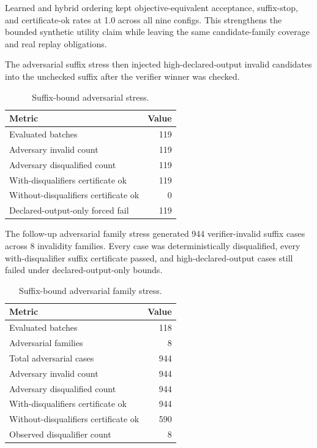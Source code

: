 \documentclass[11pt]{article}
\begin{document}
Learned and hybrid ordering kept objective-equivalent acceptance, suffix-stop,
and certificate-ok rates at 1.0 across all nine configs. This strengthens the
bounded synthetic utility claim while leaving the same candidate-family
coverage and real replay obligations.

The adversarial suffix stress then injected high-declared-output invalid
candidates into the unchecked suffix after the verifier winner was checked.

\begin{table}[h]
\centering
\caption{Suffix-bound adversarial stress.}
\begin{tabular}{lr}
\toprule
Metric & Value \\
\midrule
Evaluated batches & 119 \\
Adversary invalid count & 119 \\
Adversary disqualified count & 119 \\
With-disqualifiers certificate ok & 119 \\
Without-disqualifiers certificate ok & 0 \\
Declared-output-only forced fail & 119 \\
\bottomrule
\end{tabular}
\end{table}

The follow-up adversarial family stress generated 944 verifier-invalid suffix
cases across 8 invalidity families. Every case was deterministically
disqualified, every with-disqualifier suffix certificate passed, and
high-declared-output cases still failed under declared-output-only bounds.

\begin{table}[h]
\centering
\caption{Suffix-bound adversarial family stress.}
\begin{tabular}{lr}
\toprule
Metric & Value \\
\midrule
Evaluated batches & 118 \\
Adversarial families & 8 \\
Total adversarial cases & 944 \\
Adversary invalid count & 944 \\
Adversary disqualified count & 944 \\
With-disqualifiers certificate ok & 944 \\
Without-disqualifiers certificate ok & 590 \\
Observed disqualifier count & 8 \\
\bottomrule
\end{tabular}
\end{table}
\end{document}
